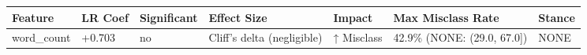 \begin{tabular}{lllllll}
\toprule
Feature & LR Coef & Significant & Effect Size & Impact & Max Misclass Rate & Stance \\
\midrule
word\_count & +0.703 & no & Cliff's delta (negligible) & ↑ Misclass & 42.9\% (NONE: (29.0, 67.0]) & NONE \\
\bottomrule
\end{tabular}
